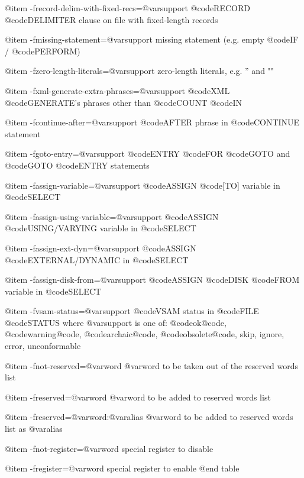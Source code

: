@item -frecord-delim-with-fixed-recs=@var{support}
@code{RECORD} @code{DELIMITER} clause on file with fixed-length records

@item -fmissing-statement=@var{support}
missing statement (e.g. empty @code{IF} / @code{PERFORM})

@item -fzero-length-literals=@var{support}
zero-length literals, e.g. '' and ""

@item -fxml-generate-extra-phrases=@var{support}
@code{XML} @code{GENERATE'}s phrases other than @code{COUNT} @code{IN}

@item -fcontinue-after=@var{support}
@code{AFTER} phrase in @code{CONTINUE} statement

@item -fgoto-entry=@var{support}
@code{ENTRY} @code{FOR} @code{GOTO} and @code{GOTO} @code{ENTRY} statements

@item -fassign-variable=@var{support}
@code{ASSIGN} @code{[TO]} variable in @code{SELECT}

@item -fassign-using-variable=@var{support}
@code{ASSIGN} @code{USING/VARYING} variable in @code{SELECT}

@item -fassign-ext-dyn=@var{support}
@code{ASSIGN} @code{EXTERNAL/DYNAMIC} in @code{SELECT}

@item -fassign-disk-from=@var{support}
@code{ASSIGN} @code{DISK} @code{FROM} variable in @code{SELECT}

@item -fvsam-status=@var{support}
@code{VSAM} status in @code{FILE} @code{STATUS}
	where @var{support} is one of:
	@code{ok@code{, @code{warning@code{, @code{archaic@code{, @code{obsolete@code{, }skip}, }ignore}, }error}, }unconformable}

@item -fnot-reserved=@var{word}
@var{word} to be taken out of the reserved words list

@item -freserved=@var{word}
@var{word} to be added to reserved words list

@item -freserved=@var{word}:@var{alias}
@var{word} to be added to reserved words list as @var{alias}

@item -fnot-register=@var{word}
special register to disable

@item -fregister=@var{word}
special register to enable
@end table
